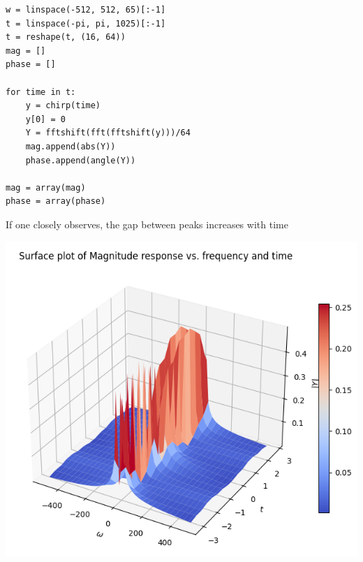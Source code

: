 \documentclass[12pt, a4paper]{report}
\begin{document}
\begin{verbatim}
w = linspace(-512, 512, 65)[:-1]
t = linspace(-pi, pi, 1025)[:-1]
t = reshape(t, (16, 64))
mag = []
phase = []

for time in t:
    y = chirp(time)
    y[0] = 0
    Y = fftshift(fft(fftshift(y)))/64
    mag.append(abs(Y))
    phase.append(angle(Y))

mag = array(mag)
phase = array(phase)
\end{verbatim}
If one closely observes, the gap between peaks increases with time
\clearpage
\begin{center}
	\includegraphics[scale=0.55]{Figure_26.png} 
	\label{fig:rawdata}
\end{center}
\end{document}
